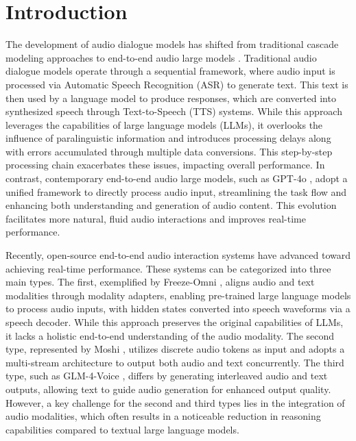 \section{Introduction}

The development of audio dialogue models has shifted from traditional cascade modeling approaches to end-to-end audio large models \cite{hassid2024textually}. Traditional audio dialogue models operate through a sequential framework, where audio input is processed via Automatic Speech Recognition (ASR) to generate text. This text is then used by a language model to produce responses, which are converted into synthesized speech through Text-to-Speech (TTS) systems. While this approach leverages the capabilities of large language models (LLMs), it overlooks the influence of paralinguistic information and introduces processing delays along with errors accumulated through multiple data conversions. This step-by-step processing chain exacerbates these issues, impacting overall performance. In contrast, contemporary end-to-end audio large models, such as GPT-4o \cite{HelloGPT4o}, adopt a unified framework to directly process audio input, streamlining the task flow and enhancing both understanding and generation of audio content. This evolution facilitates more natural, fluid audio interactions and improves real-time performance.

Recently, open-source end-to-end audio interaction systems have advanced toward achieving real-time performance. These systems can be categorized into three main types. The first, exemplified by Freeze-Omni \cite{wang2024freeze}, aligns audio and text modalities through modality adapters, enabling pre-trained large language models to process audio inputs, with hidden states converted into speech waveforms via a speech decoder. While this approach preserves the original capabilities of LLMs, it lacks a holistic end-to-end understanding of the audio modality. The second type, represented by Moshi \cite{defossez2024moshi}, utilizes discrete audio tokens as input and adopts a multi-stream architecture to output both audio and text concurrently. The third type, such as GLM-4-Voice \cite{zeng2024glm}, differs by generating interleaved audio and text outputs, allowing text to guide audio generation for enhanced output quality. However, a key challenge for the second and third types lies in the integration of audio modalities, which often results in a noticeable reduction in reasoning capabilities compared to textual large language models.

